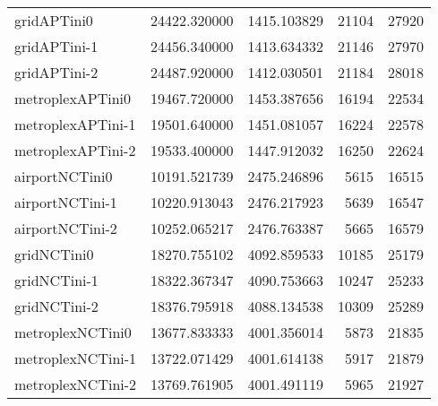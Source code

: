 \begin{table}[h]
\begin{longtable}{lrrrr}
gridAPTini0 & 24422.320000 & 1415.103829 & 21104 & 27920 \\
gridAPTini-1 & 24456.340000 & 1413.634332 & 21146 & 27970 \\
gridAPTini-2 & 24487.920000 & 1412.030501 & 21184 & 28018 \\
metroplexAPTini0 & 19467.720000 & 1453.387656 & 16194 & 22534 \\
metroplexAPTini-1 & 19501.640000 & 1451.081057 & 16224 & 22578 \\
metroplexAPTini-2 & 19533.400000 & 1447.912032 & 16250 & 22624 \\
airportNCTini0 & 10191.521739 & 2475.246896 & 5615 & 16515 \\
airportNCTini-1 & 10220.913043 & 2476.217923 & 5639 & 16547 \\
airportNCTini-2 & 10252.065217 & 2476.763387 & 5665 & 16579 \\
gridNCTini0 & 18270.755102 & 4092.859533 & 10185 & 25179 \\
gridNCTini-1 & 18322.367347 & 4090.753663 & 10247 & 25233 \\
gridNCTini-2 & 18376.795918 & 4088.134538 & 10309 & 25289 \\
metroplexNCTini0 & 13677.833333 & 4001.356014 & 5873 & 21835 \\
metroplexNCTini-1 & 13722.071429 & 4001.614138 & 5917 & 21879 \\
metroplexNCTini-2 & 13769.761905 & 4001.491119 & 5965 & 21927 \\
\end{longtable}
\end{table}

